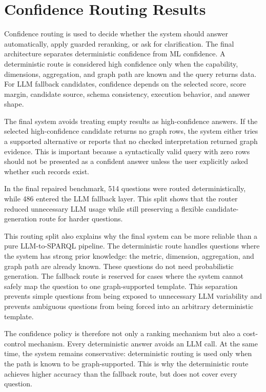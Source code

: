 \documentclass[
  12pt,
  english,
  oneside]{report}
\begin{document}
\section{Confidence Routing Results}
\label{sec:confidence-routing-results}

Confidence routing is used to decide whether the system should answer automatically, apply guarded reranking, or ask for clarification. The final architecture separates deterministic confidence from ML confidence. A deterministic route is considered high confidence only when the capability, dimensions, aggregation, and graph path are known and the query returns data. For LLM fallback candidates, confidence depends on the selected score, score margin, candidate source, schema consistency, execution behavior, and answer shape.

The final system avoids treating empty results as high-confidence answers. If the selected high-confidence candidate returns no graph rows, the system either tries a supported alternative or reports that no checked interpretation returned graph evidence. This is important because a syntactically valid query with zero rows should not be presented as a confident answer unless the user explicitly asked whether such records exist.

In the final repaired benchmark, 514 questions were routed deterministically, while 486 entered the LLM fallback layer. This split shows that the router reduced unnecessary LLM usage while still preserving a flexible candidate-generation route for harder questions.

This routing split also explains why the final system can be more reliable than a pure LLM-to-SPARQL pipeline. The deterministic route handles questions where the system has strong prior knowledge: the metric, dimension, aggregation, and graph path are already known. These questions do not need probabilistic generation. The fallback route is reserved for cases where the system cannot safely map the question to one graph-supported template. This separation prevents simple questions from being exposed to unnecessary LLM variability and prevents ambiguous questions from being forced into an arbitrary deterministic template.

The confidence policy is therefore not only a ranking mechanism but also a cost-control mechanism. Every deterministic answer avoids an LLM call. At the same time, the system remains conservative: deterministic routing is used only when the path is known to be graph-supported. This is why the deterministic route achieves higher accuracy than the fallback route, but does not cover every question.
\end{document}
